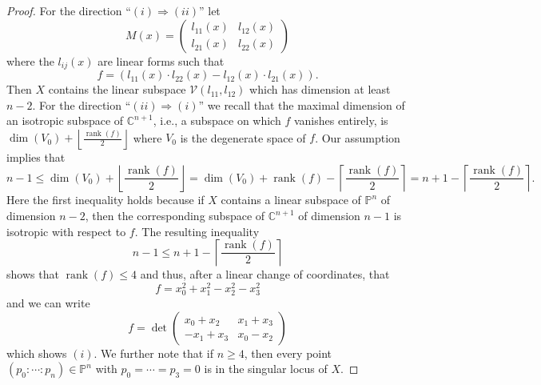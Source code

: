 \documentclass[a4paper,10pt]{amsart}
\theoremstyle{definition}
\theoremstyle{plain}
\newcommand{\rank}{\operatorname{rank}} %
\newcommand{\cV}{{\mathcal V}}
\newcommand{\C}{{\mathbb C}}
\newcommand{\pp}{\mathbb{P}}
\begin{document}
\begin{proof}
    For the direction ``$(i)\Rightarrow(ii)$'' let
    \begin{equation*}
        M(x)=\left(\begin{matrix}
            l_{11}(x)& l_{12}(x)\\ l_{21}(x)& l_{22}(x)
        \end{matrix}\right)
    \end{equation*}
    where the $l_{ij}(x)$ are linear forms such that
    \begin{equation}\label{eq:quadraticexpansion}
        f=\left(l_{11}(x)\cdot l_{22}(x) - l_{12}(x)\cdot l_{21}(x)\right).
    \end{equation}
    Then $X$ contains the linear subspace $\cV(l_{11},l_{12})$ which has dimension at least $n-2$. For the direction ``$(ii)\Rightarrow(i)$'' we recall that the maximal dimension of an isotropic subspace of $\C^{n+1}$, i.e., a subspace on which $f$ vanishes entirely, is $\dim(V_0)+\left\lfloor\frac{\rank(f)}{2}\right\rfloor$ where $V_0$ is the degenerate space of $f$. Our assumption implies that
    \begin{equation*}
        n-1\leq\dim(V_0)+\left\lfloor\frac{\rank(f)}{2}\right\rfloor=\dim(V_0)+\rank(f)-\left\lceil\frac{\rank(f)}{2}\right\rceil=n+1-\left\lceil\frac{\rank(f)}{2}\right\rceil.
    \end{equation*}
    Here the first inequality holds because if $X$ contains a linear subspace of $\pp^n$ of dimension $n-2$, then the corresponding subspace of $\C^{n+1}$ of dimension $n-1$ is isotropic with respect to $f$. The resulting inequality
    \begin{equation*}
        n-1\leq n+1-\left\lceil\frac{\rank(f)}{2}\right\rceil
    \end{equation*}
    shows that $\rank(f)\leq 4$ and thus, after a linear change of coordinates, that
    \begin{equation*}
        f=x_0^2+x_1^2-x_2^2-x_3^2
    \end{equation*}
    and we can write
    \begin{equation*}
        f=\det\left(\begin{matrix}
            x_0+x_2& x_1+x_3\\ -x_1+x_3& x_0-x_2
        \end{matrix}\right)
    \end{equation*}
    which shows $(i)$. We further note that if $n\geq4$, then every point $(p_0:\cdots:p_n)\in\pp^n$ with $p_0=\cdots=p_3=0$ is in the singular locus of $X$.  
\end{proof}
\end{document}
